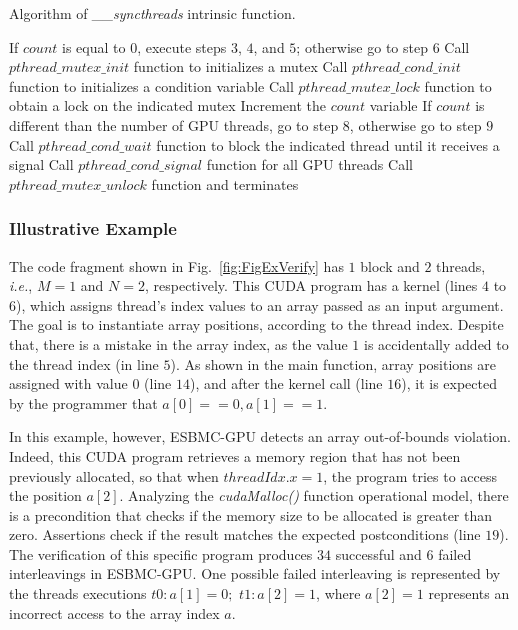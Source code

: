 \documentclass[times, doublespace]{cpeauth}
\begin{document}
\begin{algorithm}
\caption{Algorithm of \textit{\_\_syncthreads} intrinsic function.}
\label{fig:syncthreads}
\begin{algorithmic}[1]
	\State If $count$ is equal to $0$, execute steps $3$, $4$, and $5$; otherwise go to step $6$ 
	\State Call $pthread\_mutex\_init$ function to initializes a mutex
	\State Call $pthread\_cond\_init$ function to initializes a condition variable 
	\State Call $pthread\_mutex\_lock$ function to obtain a lock on the indicated mutex
	\State Increment the $count$ variable
	\State If $count$ is different than the number of GPU threads, go to step $8$, otherwise go to step $9$
	\State Call $pthread\_cond\_wait$ function to block the indicated thread until it receives a signal
	\State Call $pthread\_cond\_signal$ function for all GPU threads
	\State Call $pthread\_mutex\_unlock$ function and terminates
  \EndProcedure
\end{algorithmic}
\end{algorithm}

\subsubsection{Illustrative Example}
\vspace{-2pt}
\label{sec:ilustrativeExample}

The code fragment shown in Fig.~\ref{fig:FigExVerify} has $1$ block and $2$ threads, {\it i.e.}, $M=1$ and $N=2$, respectively. This CUDA program has a kernel (lines $4$ to $6$), which assigns thread's index values to an array passed as an input argument. The goal is to instantiate array positions, according to the thread index. Despite that, there is a mistake in the array index, as the value $1$ is accidentally added to the thread index (in line $5$). As shown in the main function, array positions are assigned with value $0$ (line $14$), and after the kernel call (line $16$), it is expected by the programmer that $a[0]==0, a[1]==1$.

In this example, however, ESBMC-GPU detects an array out-of-bounds violation. Indeed, this CUDA program retrieves a memory region that has not been previously allocated, so that when $threadIdx.x = 1$, the program tries to access the position $a[2]$. Analyzing the \textit{cudaMalloc()} function operational model, there is a precondition that checks if the memory size to be allocated is greater than zero. Assertions check if the result matches the expected postconditions (line $19$). The verification of this specific program produces $34$ successful and $6$ failed interleavings in ESBMC-GPU. One possible failed interleaving is represented by the threads executions $t0:{a[1]=0};$ $t1:{a[2]=1}$, where $a[2]=1$ represents an incorrect access to the array index $a$.    
\end{document}
